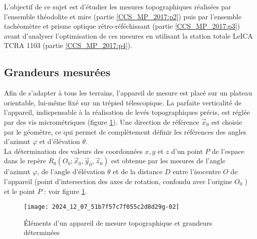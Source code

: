 \begin{obj}
L'objectif de ce sujet est d'étudier les mesures topographiques réalisées par l'ensemble théodolite et mire (partie \ref{CCS_MP_2017:p2}) puis par l'ensemble tachéomètre et prisme optique rétro-réféchissant (partie \ref{CCS_MP_2017:p3}) avant d'analyser l'optimisation de ces mesures en utilisant la station totale LeICA TCRA 1103 (partie \ref{CCS_MP_2017:p4}).
\end{obj}

\subsection{Grandeurs mesurées}
Afin de s'adapter à tous les terrains, l'appareil de mesure est placé sur un plateau orientable, lui-même fixé sur un trépied télescopique. La parfaite verticalité de l'appareil, indispensable à la réalisation de levés topographiques précis, est réglée par des vis micrométriques (figure \ref{CCS_MP_2017:fig_02}). Une direction de référence $\vec{x}_{0}$ est choisie par le géomètre, ce qui permet de complètement définir les références des angles d'azimut $\varphi$ et d'élévation $\theta$.\\
La détermination des valeurs des coordonnées $x, y$ et $z$ d'un point $P$ de l'espace dans le repère $R_{0}\left(O_{0} ; \vec{x}_{0}, \vec{y}_{0}, \vec{z}_{0}\right)$ est obtenue par les mesures de l'angle d'azimut $\varphi$, de l'angle d'élévation $\theta$ et de la distance $D$ entre l'isocentre $O$ de l'appareil (point d'intersection des axes de rotation, confondu avec l'origine $O_{0}$ ) et le point $P$ : voir figure \ref{CCS_MP_2017:fig_02}.\\

\begin{figure}[!h]
\centering
\texttt{[image: 2024\_12\_07\_51b7f57c7f055c2d8d29g-02]}

\caption{Éléments d'un appareil de mesure topographique et grandeurs déterminées \label{CCS_MP_2017:fig_02}}
\end{figure}

